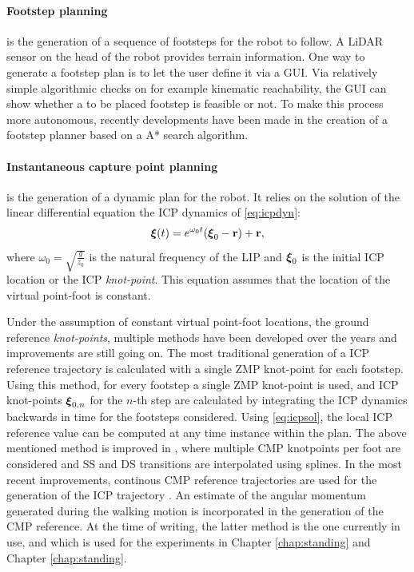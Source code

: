 \paragraph{Footstep planning} is the generation of a sequence of footsteps for the robot to follow. A \ac{LiDAR} sensor on the head of the robot provides terrain information. One way to generate a footstep plan is to let the user define it via a \ac{GUI}. Via relatively simple algorithmic checks on for example kinematic reachability, the \ac{GUI} can show whether a to be placed footstep is feasible or not. To make this process more autonomous, recently developments have been made in the creation of a footstep planner based on a A* search algorithm. 
\paragraph{Instantaneous capture point planning}\label{subsec:icpplan} is the generation of a dynamic plan for the robot. It relies on the solution of the linear differential equation the \ac{ICP} dynamics of \eqref{eq:icpdyn}:
\begin{equation}\label{eq:icpsol}
	\boldsymbol{\xi}(t)=e^{\omega_0t}(\boldsymbol{\xi}_0- \mathbf{r}) + \mathbf{r},
\end{equation}
where $\omega_0=\sqrt{\frac{g}{z_0}}$ is the natural frequency of the \ac{LIP} and $\boldsymbol{\xi}_0$ is the initial \ac{ICP} location or the \ac{ICP} \textit{knot-point}. This equation assumes that the location of the virtual point-foot is constant. 

Under the assumption of constant virtual point-foot locations, the ground reference \textit{knot-points}, multiple methods have been developed over the years and improvements are still going on. The most traditional generation of a \ac{ICP} reference trajectory is calculated with a single \ac{ZMP} knot-point \cite{englsberger2012integration} for each footstep. Using this method, for every footstep a single \ac{ZMP} knot-point is used, and \ac{ICP} knot-points $\boldsymbol{\xi}_{0,n}$ for the $n$-th step are calculated by integrating the \ac{ICP} dynamics backwards in time for the footsteps considered. Using \eqref{eq:icpsol}, the local \ac{ICP} reference value can be computed at any time instance within the plan. 
\paraskip
The above mentioned method is improved in \cite{englsberger2014trajectory}, where multiple \ac{CMP} knotpoints per foot are considered and \ac{SS} and \ac{DS} transitions are interpolated using splines. In the most recent improvements, continous \ac{CMP} reference trajectories are used for the generation of the \ac{ICP} trajectory \cite{seyde2018inclusion}. An estimate of the angular momentum generated during the walking motion is incorporated in the generation of the \ac{CMP} reference. At the time of writing, the latter method is the one currently in use, and which is used for the experiments in Chapter \ref{chap:standing} and Chapter \ref{chap:standing}.
